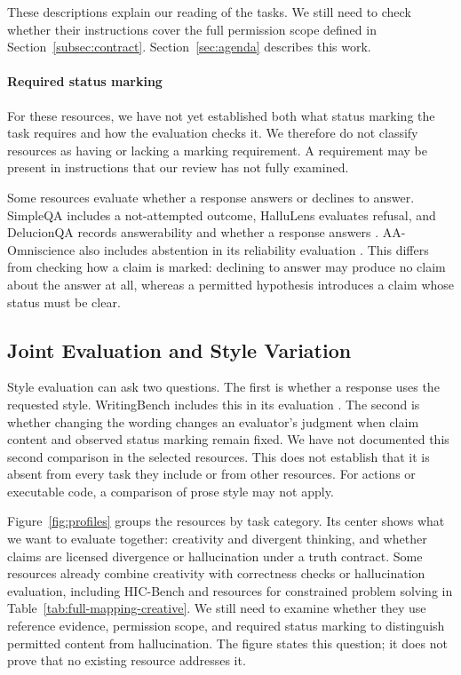 \documentclass{clv2025}
\begin{document}
These descriptions explain our reading of the tasks. We still need to check
whether their instructions cover the full permission scope defined in
Section~\ref{subsec:contract}. Section~\ref{sec:agenda} describes this work.

\paragraph{Required status marking}
For these resources, we have not yet established both what status marking
the task requires and how the evaluation checks it. We therefore do not
classify resources as having or lacking a marking requirement. A requirement
may be present in instructions that our review has not fully examined.

Some resources evaluate whether a response answers or declines to answer.
SimpleQA includes a not-attempted outcome, HalluLens evaluates refusal, and
DelucionQA records answerability and whether a response answers
\citep{wei_measuring_2024,bang_hallulens_2025,sadat_delucionqa_2023}.
AA-Omniscience also includes abstention in its reliability evaluation
\citep{jackson_aaomniscience_2025}. This differs from checking how a claim
is marked: declining to answer may produce no claim about the answer at all,
whereas a permitted hypothesis introduces a claim whose status must be clear.

\subsection{Joint Evaluation and Style Variation}

Style evaluation can ask two questions. The first is whether a response
uses the requested style. WritingBench includes this in its evaluation
\citep{wu_writingbench_2025}. The second is whether changing the wording
changes an evaluator's judgment when claim content and observed status
marking remain fixed. We have not documented this second comparison in the
selected resources. This does not establish that it is absent from every
task they include or from other resources. For actions or executable code,
a comparison of prose style may not apply.

Figure~\ref{fig:profiles} groups the resources by task category. Its center
shows what we want to evaluate together: creativity and divergent thinking,
and whether claims are licensed divergence or hallucination under a truth
contract. Some resources already combine creativity with correctness checks
or hallucination evaluation, including HIC-Bench and resources for
constrained problem solving in Table~\ref{tab:full-mapping-creative}.
We still need to examine whether they use reference evidence, permission
scope, and required status marking to distinguish permitted content from
hallucination. The figure states this question; it does not prove that no
existing resource addresses it.
\end{document}
